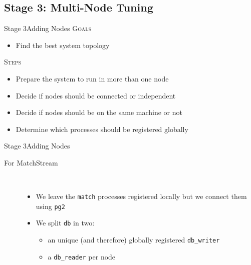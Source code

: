 \documentclass[utf8]{beamer}
\begin{document}
\subsection{Stage 3: Multi-Node Tuning}
\begin{frame}{Stage 3}{Adding Nodes}
	\textsc{Goals}
	\begin{itemize}
		\item Find the best system topology
	\end{itemize}
	\pause
	\textsc{Steps}
	\begin{itemize}
		\item Prepare the system to run in more than one node
		\item Decide if nodes should be connected or independent
		\item Decide if nodes should be on the same machine or not
		\item Determine which processes should be registered globally
	\end{itemize}
\end{frame}
\begin{frame}{Stage 3}{Adding Nodes}
	\begin{description}
		\item[For MatchStream]~\\
			\begin{itemize}
				\item We leave the \texttt{match} processes registered locally but we connect them using \texttt{pg2}
				\item We split \texttt{db} in two:
					\begin{itemize}
						\item an unique (and therefore) globally registered \texttt{db\_writer}
						\item a \texttt{db\_reader} per node
					\end{itemize}
			\end{itemize}
	\end{description}
\end{frame}
\end{document}
